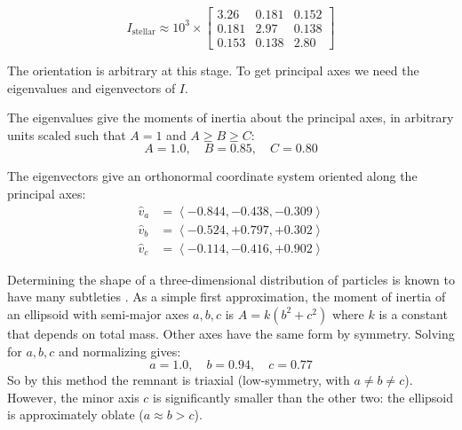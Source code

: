 \documentclass[twocolumn]{aastex63}
\begin{document}
\[  I_{\text{stellar}} \approx 10^3 \times \begin{bmatrix}
		3.26 & 0.181 & 0.152\\
		0.181 & 2.97 & 0.138\\
		0.153 & 0.138 & 2.80
	\end{bmatrix} \] %
		
The orientation is arbitrary at this stage. To get principal axes we need the eigenvalues and eigenvectors of $I$. 

The eigenvalues give the moments of inertia about the principal axes, in arbitrary units scaled such that $A=1$ and $A \ge B \ge C$:
\[ A=1.0,\quad B= 0.85,\quad C=0.80 \]

The eigenvectors give an orthonormal coordinate system oriented along the principal axes:
\begin{align*}
	\hat{v}_a &= \left< -0.844, -0.438, -0.309 \right> \\
	\hat{v}_b &= \left< -0.524, +0.797,  +0.302 \right> \\
	\hat{v}_c &= \left< -0.114, -0.416 , +0.902 \right>
\end{align*}

Determining the shape of a three-dimensional distribution of particles is known to have many subtleties \citep{maccio_concentration_2007, jing_triaxial_2002}. As a simple first approximation, the moment of inertia of an ellipsoid with semi-major axes $a, b, c$ is $A = k(b^2 + c^2)$ where $k$ is a constant that depends on total mass. Other axes have the same form by symmetry. Solving for $a, b, c$ and normalizing gives:
\[ a = 1.0,\quad b = 0.94,\quad c = 0.77 \]
So by this method the remnant is triaxial (low-symmetry, with $a \ne b \ne c$). However, the minor axis $c$ is significantly smaller than the other two: the ellipsoid is approximately oblate ($a \approx b > c$).

%
%
\end{document}
